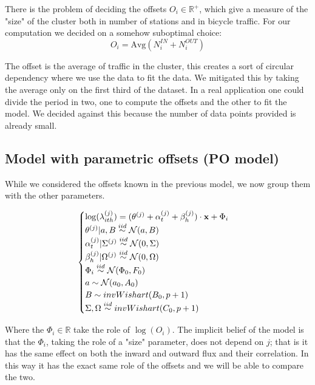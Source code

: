 \documentclass[11pt,twoside]{report}
\begin{document}

There is the problem of deciding the offsets $O_i \in \mathbb{R}^+$, which give a measure of the "size" of the cluster both in number of stations and in bicycle traffic. For our computation we decided on a somehow suboptimal choice: 
$$O_i = \mathrm{Avg}(N^{IN}_i + N^{OUT}_i)$$

The offset is the average of traffic in the cluster, this creates a sort of circular dependency where we use the data to fit the data. We mitigated this by taking the average only on the first third of the dataset. In a real application one could divide the period in two, one to compute the offsets and the other to fit the model. We decided against this because the number of data points provided is already small.

\subsection{Model with parametric offsets (PO model)}
While we considered the offsets known in the previous model, we now group them with the other parameters.

\begin{equation}
\begin{cases}
\log(\lambda^{(j)}_{ith}) = (\boldmath{\theta^{(j)} +  \alpha^{(j)}_{t} + \beta_{h}^{(j)})}\cdot\mathbf{x} + \Phi_i\\
\theta^{(j)}|a,B \stackrel{iid}{\sim} \mathcal{N}(a,B)\\
\alpha_{t}^{(j)}|\Sigma^{(j)} \stackrel{iid}{\sim} \mathcal{N}(0, \Sigma)\\
\beta_{h}^{(j)}|\Omega^{(j)} \stackrel{iid}{\sim} \mathcal{N}(0, \Omega)\\
\Phi_i \stackrel{iid}{\sim} \mathcal{N}(\Phi_0, F_0)\\
a \sim \mathcal{N}(a_0, A_0)\\
B \sim invWishart(B_0, p+1)\\
\Sigma, \Omega \stackrel{iid}{\sim} invWishart(C_0, p+1)

\end{cases}
\end{equation}

Where the $\Phi_i \in \mathbb{R}$ take the role of $\log(O_i)$. The implicit belief of the model is that the $\Phi_i$, taking the role of a "size" parameter, does not depend on $j$; that is it has the same effect on both the inward and outward flux and their correlation. In this way it has the exact same role of the offsets and we will be able to compare the two.
\end{document}
